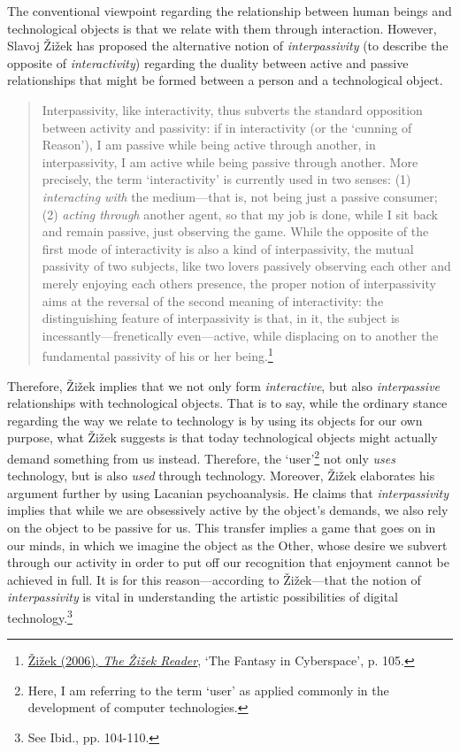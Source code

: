 The conventional viewpoint regarding the relationship between human beings and technological objects is that we relate with them through interaction. However, Slavoj \v{Z}i\v{z}ek has proposed the alternative notion of  \emph{interpassivity} (to describe the opposite of \emph{interactivity}) regarding the duality between active and passive relationships that might be formed between a person and a technological object.
\begin{quote}
Interpassivity, like interactivity, thus subverts the standard opposition between activity and passivity: if in interactivity (or the `cunning of Reason'), I am passive while being active through another, in interpassivity, I am active while being passive through another. More precisely, the term `interactivity' is currently used in two senses: (1) \emph{interacting with} the medium---that is, not being just a passive consumer; (2) \emph{acting through} another agent, so that my job is done, while I sit back and remain passive, just observing the game. While the opposite of the first mode of interactivity is also a kind of interpassivity, the mutual passivity of two subjects, like two lovers passively observing each other and merely enjoying each others presence, the proper notion of interpassivity aims at the reversal of the second meaning of interactivity: the distinguishing feature of interpassivity is that, in it, the subject is incessantly---frenetically even---active, while displacing on to another the fundamental passivity of his or her being.\footnote{\hyperlink{zizekreader}{\v{Z}i\v{z}ek (2006), \emph{The \v{Z}i\v{z}ek Reader}}, `The Fantasy in Cyberspace', p. 105.}
\end{quote}
Therefore, \v{Z}i\v{z}ek implies that we not only form \emph{interactive}, but also \emph{interpassive} relationships with technological objects. That is to say, while the ordinary stance regarding the way we relate to technology is by using its objects for our own purpose, what \v{Z}i\v{z}ek suggests is that today technological objects might actually demand something from us instead. Therefore, the `user'\footnote{Here, I am referring to the term `user' as applied commonly in the development of computer technologies.} not only \emph{uses} technology, but is also \emph{used} through technology. Moreover, \v{Z}i\v{z}ek elaborates his argument further by using Lacanian psychoanalysis. He claims that \emph{interpassivity} implies that while we are obsessively active by the object's demands, we also rely on the object to be passive for us. This transfer implies a game that goes on in our minds, in which we imagine the object as the Other, whose desire we subvert through our activity in order to put off our recognition that enjoyment cannot be achieved in full. It is for this reason---according to \v{Z}i\v{z}ek---that the notion of \emph{interpassivity} is vital in understanding the artistic possibilities of digital technology.\footnote{See Ibid., pp. 104-110.} 

